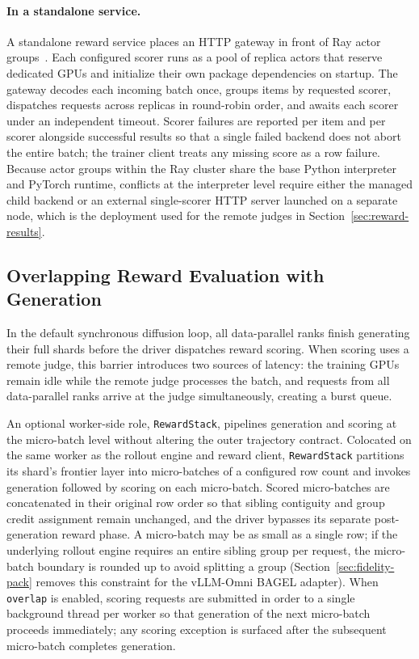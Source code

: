 \paragraph{In a standalone service.}
A standalone reward service places an HTTP gateway in front of Ray actor groups~\citep{moritz2018ray}.
Each configured scorer runs as a pool of replica actors that reserve dedicated GPUs and initialize their own package dependencies on startup.
The gateway decodes each incoming batch once, groups items by requested scorer, dispatches requests across replicas in round-robin order, and awaits each scorer under an independent timeout.
Scorer failures are reported per item and per scorer alongside successful results so that a single failed backend does not abort the entire batch; the trainer client treats any missing score as a row failure.
Because actor groups within the Ray cluster share the base Python interpreter and PyTorch runtime, conflicts at the interpreter level require either the managed child backend or an external single-scorer HTTP server launched on a separate node, which is the deployment used for the remote judges in Section~\ref{sec:reward-results}.

\subsection{Overlapping Reward Evaluation with Generation}
\label{sec:reward-overlap}

In the default synchronous diffusion loop, all data-parallel ranks finish generating their full shards before the driver dispatches reward scoring.
When scoring uses a remote judge, this barrier introduces two sources of latency: the training GPUs remain idle while the remote judge processes the batch, and requests from all data-parallel ranks arrive at the judge simultaneously, creating a burst queue.

An optional worker-side role, \texttt{RewardStack}, pipelines generation and scoring at the micro-batch level without altering the outer trajectory contract.
Colocated on the same worker as the rollout engine and reward client, \texttt{RewardStack} partitions its shard's frontier layer into micro-batches of a configured row count and invokes generation followed by scoring on each micro-batch.
Scored micro-batches are concatenated in their original row order so that sibling contiguity and group credit assignment remain unchanged, and the driver bypasses its separate post-generation reward phase.
A micro-batch may be as small as a single row; if the underlying rollout engine requires an entire sibling group per request, the micro-batch boundary is rounded up to avoid splitting a group (Section~\ref{sec:fidelity-pack} removes this constraint for the vLLM-Omni BAGEL adapter).
When \texttt{overlap} is enabled, scoring requests are submitted in order to a single background thread per worker so that generation of the next micro-batch proceeds immediately; any scoring exception is surfaced after the subsequent micro-batch completes generation.


